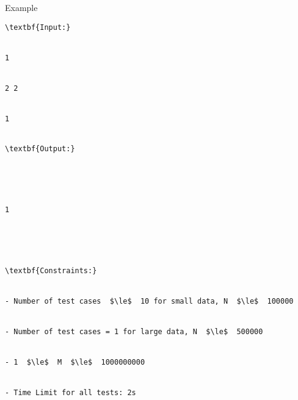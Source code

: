 Example
\begin{verbatim}
\textbf{Input:}


1


2 2


1


\textbf{Output:}





1





\textbf{Constraints:}


- Number of test cases  $\le$  10 for small data, N  $\le$  100000


- Number of test cases = 1 for large data, N  $\le$  500000


- 1  $\le$  M  $\le$  1000000000


- Time Limit for all tests: 2s\end{verbatim}
